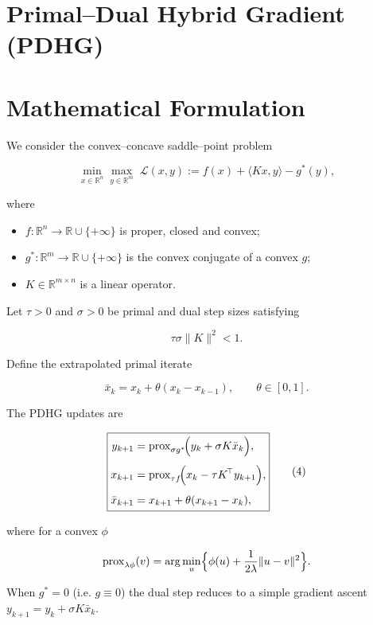 \documentclass{article}
\begin{document}
\section*{Primal–Dual Hybrid Gradient (PDHG)}

\section*{Mathematical Formulation}
We consider the convex–concave saddle–point problem  

\[
\min_{x\in\mathbb R^{n}}\max_{y\in\mathbb R^{m}} \; \mathcal L (x,y)
:= f(x)+\langle Kx,y\rangle - g^{*}(y),
\tag{1}
\]

where  

\begin{itemize}[noitemsep]
\item $f:\mathbb R^{n}\to\mathbb R\cup\{+\infty\}$ is proper, closed and convex;
\item $g^{*}:\mathbb R^{m}\to\mathbb R\cup\{+\infty\}$ is the convex conjugate of a convex $g$;
\item $K\in\mathbb R^{m\times n}$ is a linear operator.
\end{itemize}

Let $\tau>0$ and $\sigma>0$ be primal and dual step sizes satisfying  

\[
\tau\sigma\|K\|^{2}<1.
\tag{2}
\]

Define the extrapolated primal iterate  

\[
\bar x_{k}=x_{k}+\theta (x_{k}-x_{k-1}),\qquad \theta\in[0,1].
\tag{3}
\]

The PDHG updates are  

\[
\boxed{
\begin{aligned}
y_{k+1}&=\operatorname{prox}_{\sigma g^{*}}\!\Bigl(y_{k}+\sigma K\bar x_{k}\Bigr),\\[4pt]
x_{k+1}&=\operatorname{prox}_{\tau f}\!\Bigl(x_{k}-\tau K^{\!\top}y_{k+1}\Bigr),\\[4pt]
\bar x_{k+1}&=x_{k+1}+\theta (x_{k+1}-x_{k}),
\end{aligned}}
\tag{4}
\]

where for a convex $\phi$  

\[
\operatorname{prox}_{\lambda\phi}(v)=\arg\min_{u}\Bigl\{\phi(u)+\frac{1}{2\lambda}\|u-v\|^{2}\Bigr\}.
\]

When $g^{*}=0$ (i.e. $g\equiv0$) the dual step reduces to a simple gradient ascent
$y_{k+1}=y_{k}+\sigma K\bar x_{k}$.
\end{document}

